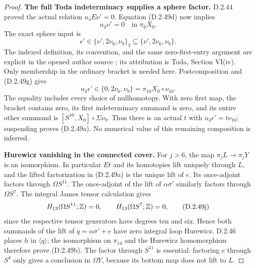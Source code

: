 \begin{proof}
\textbf{The full Toda indeterminacy supplies a sphere factor.}
D.2.44 proved the actual relation $u_4E\nu'=0$.
Equation (D.2.49d) now implies
\[
                         u_3\nu'=0\quad\text{in }\pi_6X_0.
                         \tag{D.2.49g}
\]
The exact sphere input is
\[
 \epsilon'\in\{\nu',2\nu_6,\nu_9\}_3
                  \subseteq\{\nu',2\nu_6,\nu_9\}.
 \tag{D.2.49h}
\]
The indexed definition, its convention, and the same
zero-first-entry argument are explicit in the opened author
source \cite[Section 2.5, p.~4, and Proposition 2, p.~6]
{FGHStricklandToda}; its attribution is Toda, Section VI(iv).
Only membership in the ordinary bracket is needed here.
Postcomposition and (D.2.49g) give
\[
 u_3\epsilon'\in\{0,2\nu_6,\nu_9\}
          =\pi_{10}X_0\circ\nu_{10}.
 \tag{D.2.49i}
\]
The equality includes every choice of nullhomotopy.
With zero first map, the bracket contains zero, its first
indeterminacy summand is zero, and its entire other summand
is $[S^{10},X_0]\circ\Sigma\nu_9$.
Thus there is an actual $t$ with $u_3\epsilon'=t\nu_{10}$;
suspending proves (D.2.49a).  No numerical value of this
remaining composition is inferred.

\textbf{Hurewicz vanishing in the connected cover.}
For $j>6$, the map $\pi_jL\to\pi_jY$ is an isomorphism.
In particular $Et$ and its homotopies lift uniquely through
$L$, and the lifted factorization in (D.2.49a) is the unique
lift of $e$.  Its once-adjoint factors through $\Omega S^{11}$.
The once-adjoint of the lift of $\alpha\sigma'$ similarly
factors through $\Omega S^7$.
The integral James tensor calculation gives
\[
 H_{13}(\Omega S^{11};\mathbb Z)=0,
                 \qquad H_{13}(\Omega S^7;\mathbb Z)=0,
 \tag{D.2.49j}
\]
since the respective tensor generators have degrees ten and
six.  Hence both summands of the lift of
$q=\alpha\sigma'+e$ have zero integral loop Hurewicz.
D.2.46 places $h$ in $\langle q\rangle$; the isomorphism
on $\pi_{14}$ and the Hurewicz homomorphism therefore prove
(D.2.49b).  The factor through $S^{11}$ is essential:
factoring $e$ through $S^4$ only gives a conclusion in
$\Omega Y$, because its bottom map does not lift to $L$.


\end{proof}
